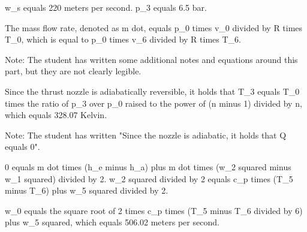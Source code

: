 w_s equals 220 meters per second.
p_3 equals 6.5 bar.

The mass flow rate, denoted as m dot, equals p_0 times v_0 divided by R times T_0, which is equal to p_0 times v_6 divided by R times T_6.

Note: The student has written some additional notes and equations around this part, but they are not clearly legible.

Since the thrust nozzle is adiabatically reversible, it holds that T_3 equals T_0 times the ratio of p_3 over p_0 raised to the power of (n minus 1) divided by n, which equals 328.07 Kelvin.

Note: The student has written "Since the nozzle is adiabatic, it holds that Q equals 0".

0 equals m dot times (h_e minus h_a) plus m dot times (w_2 squared minus w_1 squared) divided by 2.
w_2 squared divided by 2 equals c_p times (T_5 minus T_6) plus w_5 squared divided by 2.

w_0 equals the square root of 2 times c_p times (T_5 minus T_6 divided by 6) plus w_5 squared, which equals 506.02 meters per second.